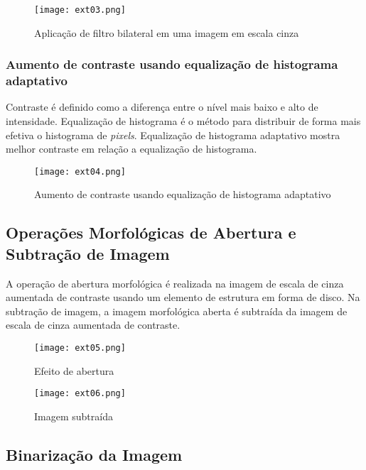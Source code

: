 \begin{figure}[H]
	\centering
	\texttt{[image: ext03.png]}
	\caption{Aplicação de filtro bilateral em uma imagem em escala cinza}
	\label{fig:ext_filter_in_gray_scale}
\end{figure}

\subsubsection{Aumento de contraste usando equalização de histograma adaptativo}

Contraste é definido como a diferença entre o nível mais baixo e alto de
intensidade. Equalização de histograma é o método para distribuir de forma mais
efetiva o histograma de \emph{pixels}. Equalização de histograma adaptativo
mostra melhor contraste em relação a equalização de histograma.

\begin{figure}[H]
	\centering
	\texttt{[image: ext04.png]}
	\caption{Aumento de contraste usando equalização de histograma adaptativo}
	\label{fig:ext_contrast_adaptive_histogram}
\end{figure}

\subsection{Operações Morfológicas de Abertura e Subtração de Imagem}

A operação de abertura morfológica é realizada na imagem de escala de cinza
aumentada de contraste usando um elemento de estrutura em forma de disco. Na
subtração de imagem, a imagem morfológica aberta é subtraída da imagem de escala
de cinza aumentada de contraste.

\begin{figure}[H]
	\centering
	\texttt{[image: ext05.png]}
	\caption{Efeito de abertura}
	\label{fig:ext_opening_effect}
\end{figure}

\begin{figure}[H]
	\centering
	\texttt{[image: ext06.png]}
	\caption{Imagem subtraída}
	\label{fig:ext_image_substraction}
\end{figure}

\subsection{Binarização da Imagem}

